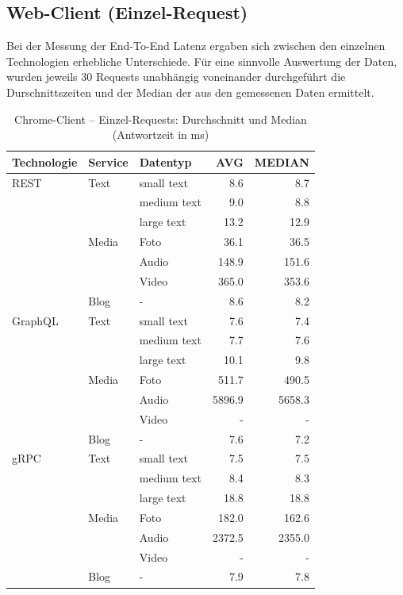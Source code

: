 \clearpage
\subsection{Web-Client (Einzel-Request)}

Bei der Messung der End-To-End Latenz ergaben sich zwischen den einzelnen Technologien erhebliche Unterschiede. 
Für eine sinnvolle Auswertung der Daten, wurden jeweils 30 Requests unabhängig voneinander durchgeführt die Durschnittszeiten und der Median der aus den gemessenen Daten ermittelt. 

\begin{table}[h]
	\centering
	\caption{Chrome-Client – Einzel-Requests: Durchschnitt und Median (Antwortzeit in ms)}
	\label{tab:chrome-single-avg}
	\renewcommand{\arraystretch}{1.1}
	\begin{tabular}{|l|l|l|r|r|}
		\hline
		\textbf{Technologie} & \textbf{Service} & \textbf{Datentyp} & \textbf{AVG} & \textbf{MEDIAN} \\
		\hline
		REST & Text  & small text  & 8.6 & 8.7 \\
		&       & medium text & 9.0 & 8.8 \\
		&       & large text  & 13.2 & 12.9 \\
		& Media & Foto        & 36.1 & 36.5 \\
		&       & Audio       & 148.9 & 151.6 \\
		&       & Video       & 365.0 & 353.6 \\
		& Blog  & -           & 8.6 & 8.2 \\
		\hline
		GraphQL & Text  & small text  & 7.6 & 7.4 \\
		&       & medium text & 7.7 & 7.6 \\
		&       & large text  & 10.1 & 9.8 \\
		& Media & Foto        & 511.7 & 490.5 \\
		&       & Audio       & 5896.9 & 5658.3 \\
		&       & Video       & - & - \\
		& Blog  & -           & 7.6 & 7.2 \\
		\hline
		gRPC & Text  & small text  & 7.5 & 7.5 \\
		&       & medium text & 8.4 & 8.3 \\
		&       & large text  & 18.8 & 18.8 \\
		& Media & Foto        & 182.0 & 162.6 \\
		&       & Audio       & 2372.5 & 2355.0 \\
		&       & Video       & - & - \\
		& Blog  & -           & 7.9 & 7.8 \\
		\hline
	\end{tabular}
\end{table}

